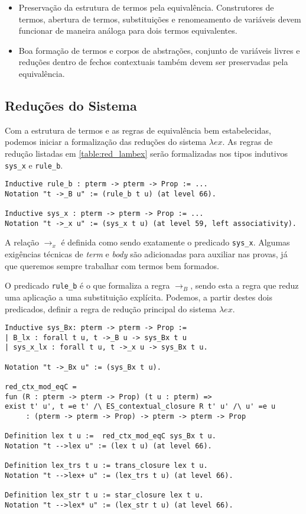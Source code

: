 \begin{itemize}
    \item Preservação da estrutura de termos pela equivalência. Construtores de
        termos, abertura de termos, substituições e renomeamento de variáveis
        devem funcionar de maneira análoga para dois termos equivalentes.
    \item Boa formação de termos e corpos de abstrações, conjunto de variáveis
        livres e reduções dentro de fechos contextuais também devem ser
        preservadas pela equivalência.
\end{itemize}

\subsection{Reduções do Sistema}
\label{sub:redu_es_do_sistema}

Com a estrutura de termos e as regras de equivalência bem estabelecidas, podemos
iniciar a formalização das reduções do sistema $\lambda ex$.
As regras de redução listadas em  \ref{table:red_lambex} serão formalizadas nos
tipos indutivos \texttt{sys\_x} e \texttt{rule\_b}.

\begin{lstlisting}[basicstyle=\small]
Inductive rule_b : pterm -> pterm -> Prop := ...
Notation "t ->_B u" := (rule_b t u) (at level 66).

Inductive sys_x : pterm -> pterm -> Prop := ...
Notation "t ->_x u" := (sys_x t u) (at level 59, left associativity).
\end{lstlisting}

A relação $\rightarrow_x$ é definida como sendo exatamente o predicado
\texttt{sys\_x}. Algumas exigências técnicas de \emph{term} e \emph{body} são
adicionadas para auxiliar nas provas, já que queremos sempre trabalhar com
termos bem formados.

O predicado \texttt{rule\_b} é o que formaliza a regra $\rightarrow_B$, sendo
esta a regra que reduz uma aplicação a uma substituição explícita. Podemos, a
partir destes dois predicados, definir a regra de redução principal do sistema
$\lambda ex$.

\begin{lstlisting}[basicstyle=\small]
Inductive sys_Bx: pterm -> pterm -> Prop :=
| B_lx : forall t u, t ->_B u -> sys_Bx t u
| sys_x_lx : forall t u, t ->_x u -> sys_Bx t u.

Notation "t ->_Bx u" := (sys_Bx t u).

red_ctx_mod_eqC = 
fun (R : pterm -> pterm -> Prop) (t u : pterm) =>
exist t' u', t =e t' /\ ES_contextual_closure R t' u' /\ u' =e u
     : (pterm -> pterm -> Prop) -> pterm -> pterm -> Prop

Definition lex t u :=  red_ctx_mod_eqC sys_Bx t u.
Notation "t -->lex u" := (lex t u) (at level 66).

Definition lex_trs t u := trans_closure lex t u.
Notation "t -->lex+ u" := (lex_trs t u) (at level 66).

Definition lex_str t u := star_closure lex t u.
Notation "t -->lex* u" := (lex_str t u) (at level 66).
\end{lstlisting}

